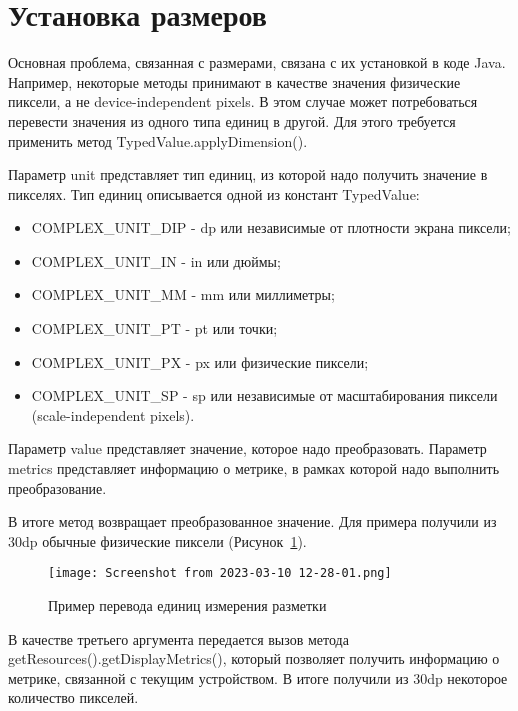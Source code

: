 \section{Установка размеров}
Основная проблема, связанная с размерами, связана с их установкой в коде
Java. Например, некоторые методы принимают в качестве значения
физические пиксели, а не device-independent pixels. В этом случае может
потребоваться перевести значения из одного типа единиц в другой. Для этого
требуется применить метод TypedValue.applyDimension().\par
Параметр unit представляет тип единиц, из которой надо получить значение в
пикселях. Тип единиц описывается одной из констант TypedValue:
\begin{itemize}
	\item COMPLEX\_UNIT\_DIP - dp или независимые от плотности экрана пиксели;
	\item COMPLEX\_UNIT\_IN - in или дюймы;
	\item COMPLEX\_UNIT\_MM - mm или миллиметры;
	\item COMPLEX\_UNIT\_PT - pt или точки;
	\item COMPLEX\_UNIT\_PX - px или физические пиксели;
	\item COMPLEX\_UNIT\_SP - sp или независимые от масштабирования
		пиксели (scale-independent pixels).
\end{itemize}
Параметр value представляет значение, которое надо преобразовать.
Параметр metrics представляет информацию о метрике, в рамках которой
надо выполнить преобразование.\par
В итоге метод возвращает преобразованное значение. 
Для примера получили из 30dp обычные физические пиксели
(Рисунок~\ref{fig:java:applydim}).

\begin{figure}[h!tp]
	\centering
	\texttt{[image: Screenshot from 2023-03-10 12-28-01.png]}
	\caption{Пример перевода единиц измерения разметки}
	\label{fig:java:applydim}
\end{figure}

В качестве третьего аргумента передается вызов метода
getResources().getDisplayMetrics(), который позволяет получить информацию
о метрике, связанной с текущим устройством. В итоге получили из 30dp
некоторое количество пикселей.

